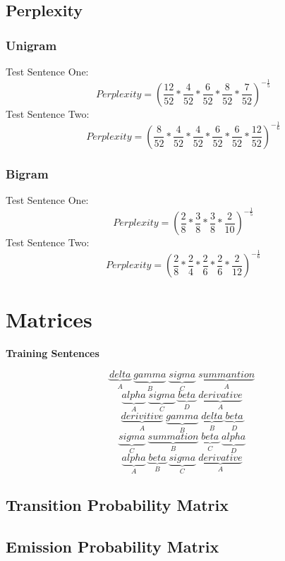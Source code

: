 \documentclass{article}
\begin{document}
\subsection{Perplexity}
\subsubsection{Unigram}
Test Sentence One: 
\begin{equation}
	Perplexity =(\frac{12}{52}*\frac{4}{52}*\frac{6}{52}*\frac{8}{52}*\frac{7}{52})^{-\frac{1}{5}} \label{Test Case One}
\end{equation}
Test Sentence Two: 
\begin{equation}
	Perplexity =(\frac{8}{52}*\frac{4}{52}*\frac{4}{52}*\frac{6}{52}*\frac{6}{52}*\frac{12}{52})^{-\frac{1}{6}} \label{Test Case One}
\end{equation}
\subsubsection{Bigram}
Test Sentence One: 
\begin{equation}
	Perplexity =(\frac{2}{8} * \frac{3}{8} * \frac{3}{8} * \frac{2}{10})^{-\frac{1}{5}}
\end{equation}
Test Sentence Two: 
\begin{equation}
	Perplexity =(\frac{2}{8} * \frac{2}{4} * \frac{2}{6} * \frac{2}{6} * \frac{2}{12})^{-\frac{1}{6}}
\end{equation}
\section{Matrices}
\begin{center}
	\textbf{Training Sentences}
\end{center}
\begin{equation}
	\underbrace{delta}_{A}\;\underbrace{gamma}_{B}\; \underbrace{sigma}_{C}\; \underbrace{summantion}_{A}\;
\end{equation}
\begin{equation}
	\underbrace{alpha}_{A}\;\underbrace{sigma}_{C}\; \underbrace{beta}_{D}\; \underbrace{derivative}_{A}\;
\end{equation}
\begin{equation}
	\underbrace{derivitive}_{A}\;\underbrace{gamma}_{B}\; \underbrace{delta}_{B}\; \underbrace{beta}_{D}\;
\end{equation}
\begin{equation}
	\underbrace{sigma}_{C}\;\underbrace{summation}_{B}\; \underbrace{beta}_{C}\; \underbrace{alpha}_{D}\;
\end{equation}
\begin{equation}
	\underbrace{alpha}_{A}\;\underbrace{beta}_{B}\; \underbrace{sigma}_{C}\; \underbrace{derivative}_{A}\;
\end{equation}
\subsection{Transition Probability Matrix}
\subsection{Emission Probability Matrix}
\end{document}
